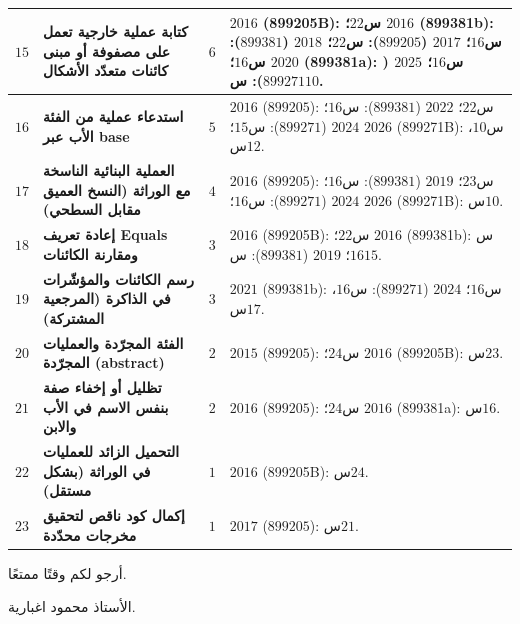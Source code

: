 \documentclass[14pt]{extarticle}
\begin{document}
{\begin{longtable}{|C{0.05\textwidth}|>{\raggedleft\arraybackslash}p{0.27\textwidth}|C{0.09\textwidth}|>{\raggedleft\arraybackslash}p{0.47\textwidth}|}
$15$ &
\textbf{كتابة عملية خارجية تعمل على مصفوفة أو مبنى كائنات متعدّد الأشكال} &
\textbf{$6$} &
$2016$ (\textenglish{899205B}): س$22$؛
$2016$ (\textenglish{899381b}): س$16$؛
$2017$ ($899205$): س$22$؛
$2018$ ($899381$): س$16$؛
$2020$ (\textenglish{899381a}): س$16$؛
$2025$ ($899271$): س$10$. \\
\hline

$16$ &
\textbf{استدعاء عملية من الفئة الأب عبر \textenglish{base}} &
\textbf{$5$} &
$2016$ ($899205$): س$22$؛
$2022$ ($899381$): س$16$؛
$2024$ ($899271$): س$15$؛
$2026$ (\textenglish{899271B}): س$10$، س$12$. \\
\hline

$17$ &
\textbf{العملية البنائية الناسخة مع الوراثة (النسخ العميق مقابل السطحي)} &
\textbf{$4$} &
$2016$ ($899205$): س$23$؛
$2019$ ($899381$): س$16$؛
$2024$ ($899271$): س$16$؛
$2026$ (\textenglish{899271B}): س$10$. \\
\hline

$18$ &
\textbf{إعادة تعريف \textenglish{Equals} ومقارنة الكائنات} &
\textbf{$3$} &
$2016$ (\textenglish{899205B}): س$22$؛
$2016$ (\textenglish{899381b}): س$16$؛
$2019$ ($899381$): س$15$. \\
\hline

$19$ &
\textbf{رسم الكائنات والمؤشّرات في الذاكرة (المرجعية المشتركة)} &
\textbf{$3$} &
$2021$ (\textenglish{899381b}): س$16$؛
$2024$ ($899271$): س$16$، س$17$. \\
\hline

$20$ &
\textbf{الفئة المجرّدة والعمليات المجرّدة (\textenglish{abstract})} &
\textbf{$2$} &
$2015$ ($899205$): س$24$؛
$2016$ (\textenglish{899205B}): س$23$. \\
\hline

$21$ &
\textbf{تظليل أو إخفاء صفة بنفس الاسم في الأب والابن} &
\textbf{$2$} &
$2016$ ($899205$): س$24$؛
$2016$ (\textenglish{899381a}): س$16$. \\
\hline

$22$ &
\textbf{التحميل الزائد للعمليات في الوراثة (بشكل مستقل)} &
\textbf{$1$} &
$2016$ (\textenglish{899205B}): س$24$. \\
\hline

$23$ &
\textbf{إكمال كود ناقص لتحقيق مخرجات محدّدة} &
\textbf{$1$} &
$2017$ ($899205$): س$21$. \\
\hline
\end{longtable}}

\vspace{1cm}
\begin{flushleft}
أرجو لكم وقتًا ممتعًا.

الأستاذ محمود اغبارية.
\end{flushleft}
\end{document}
